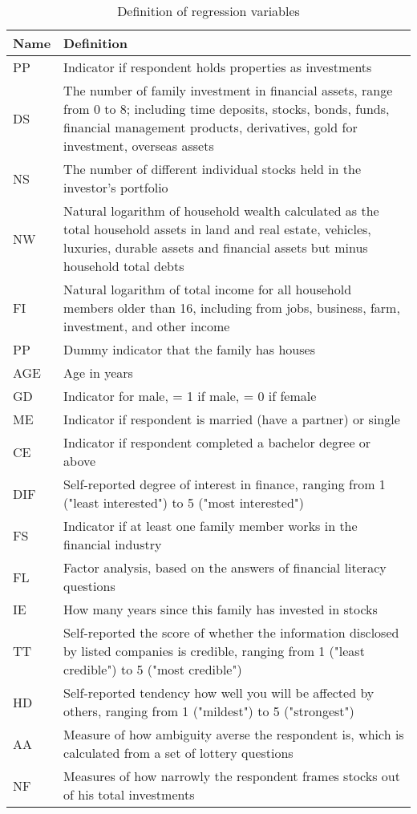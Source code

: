 \documentclass[ukenglish,nottitlepage,thmsb,11pt,letterpaper]{article}
\begin{document}
 
 \begin{spacing}{1}
 	\begin{table}[H]
 		\renewcommand\arraystretch{1.25}%
 		\centering
 		\caption{Definition of regression variables}
 		\small
 		\begin{tabular}{L{2.25cm}L{13.25cm}}
 			\toprule
 			Name   & Definition \\
 			\midrule
 			PP & Indicator if respondent holds properties as investments  \\
 			DS   & The number of family investment in financial assets, range from 0 to 8; including time deposits, stocks, bonds, funds, financial management products, derivatives, gold for investment, overseas assets  \\ 
 			NS  & The number of different individual stocks held in the investor’s portfolio  \\
            \midrule
			NW   &   Natural logarithm of household wealth calculated as the total household assets in land and real estate, vehicles, luxuries, durable assets and financial assets but minus household total debts \\
			FI     & Natural logarithm of total income for all household members older than 16, including from jobs, business, farm, investment, and other income \\
 			PP    &  Dummy indicator that the family has houses  \\ 		
 			AGE       & Age in years \\
 			GD      & Indicator for male,  = 1 if male, = 0 if female  \\
 			ME   & Indicator if respondent is married (have a partner) or single  \\
 			CE & Indicator if respondent completed a bachelor degree or above \\
 			DIF & Self-reported degree of interest in finance, ranging from 1 ("least interested") to 5 ("most interested")\\
			
 		    FS  & Indicator if at least one family member works in the financial industry \\
 			FL  & Factor analysis, based on the answers of financial literacy questions \\
 			IE  &   How many years since this family has invested in stocks \\ 			
 			TT   & Self-reported the score of whether the information disclosed by listed companies is credible, ranging from 1 ("least credible") to 5 ("most credible") \\
 			HD   & Self-reported tendency how well you will be affected by others, ranging from 1 ("mildest") to 5 ("strongest") \\
 			AA  & Measure of how ambiguity  averse the respondent is, which is calculated from a set of lottery questions \\
 			NF &  Measures of how narrowly the respondent frames stocks out of his total investments \\

 			\bottomrule
 		\end{tabular}%
 	\end{table}%
 \end{spacing}
\end{document}
